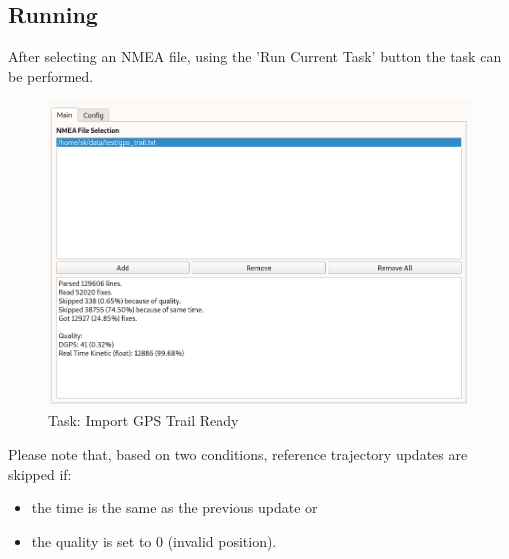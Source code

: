 \subsection{Running}

After selecting an NMEA file, using the 'Run Current Task' button the task can be performed.

\begin{figure}[H]
    \includegraphics[width=16cm,frame]{figures/gps_import_ready.png}
  \caption{Task: Import GPS Trail Ready}
\end{figure}

Please note that, based on two conditions, reference trajectory updates are skipped if:
\begin{itemize}  
\item the time is the same as the previous update or
\item the quality is set to 0 (invalid position).
\end{itemize}
